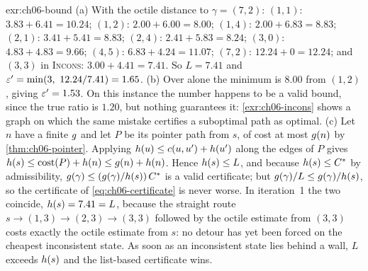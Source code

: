\begin{solution}{exr:ch06-bound}
(a) With the octile distance to $\gamma = (7,2)$: $(1,1)$: $3.83 + 6.41 = 10.24$; $(1,2)$: $2.00 + 6.00 = 8.00$; $(1,4)$: $2.00 + 6.83 = 8.83$; $(2,1)$: $3.41 + 5.41 = 8.83$; $(2,4)$: $2.41 + 5.83 = 8.24$; $(3,0)$: $4.83 + 4.83 = 9.66$; $(4,5)$: $6.83 + 4.24 = 11.07$; $(7,2)$: $12.24 + 0 = 12.24$; and $(3,3)$ in \textsc{Incons}: $3.00 + 4.41 = 7.41$. So $L = 7.41$ and $\varepsilon' = \min(3,\ 12.24/7.41) = 1.65$. (b) Over \Open alone the minimum is $8.00$ from $(1,2)$, giving $\varepsilon' = 1.53$. On this instance the number happens to be a valid bound, since the true ratio is $1.20$, but nothing guarantees it: \cref{exr:ch06-incons} shows a graph on which the same mistake certifies a suboptimal path as optimal. (c) Let $n$ have a finite $g$ and let $P$ be its pointer path from $s$, of cost at most $g(n)$ by \cref{thm:ch06-pointer}. Applying $h(u) \le c(u,u') + h(u')$ along the edges of $P$ gives $h(s) \le \operatorname{cost}(P) + h(n) \le g(n) + h(n)$. Hence $h(s) \le L$, and because $h(s) \le C^*$ by admissibility, $g(\gamma) \le (g(\gamma)/h(s))\,C^*$ is a valid certificate; but $g(\gamma)/L \le g(\gamma)/h(s)$, so the certificate of \cref{eq:ch06-certificate} is never worse. In iteration~1 the two coincide, $h(s) = 7.41 = L$, because the straight route $s \to (1,3) \to (2,3) \to (3,3)$ followed by the octile estimate from $(3,3)$ costs exactly the octile estimate from $s$: no detour has yet been forced on the cheapest inconsistent state. As soon as an inconsistent state lies behind a wall, $L$ exceeds $h(s)$ and the list-based certificate wins.
\end{solution}

